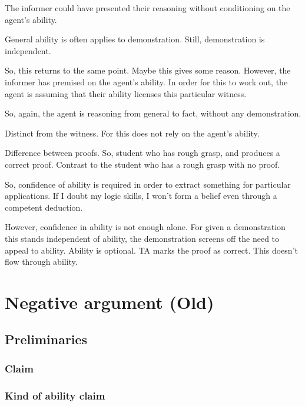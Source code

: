 \documentclass[10pt]{article}
\begin{document}
The informer could have presented their reasoning without conditioning on the agent's ability.

General ability is often applies to demonstration.
Still, demonstration is independent.

So, this returns to the same point.
Maybe this gives some reason.
However, the informer has premised on the agent's ability.
In order for this to work out, the agent is assuming that their ability licenses this particular witness.

So, again, the agent is reasoning from general to fact, without any demonstration.


Distinct from the witness.
For this does not rely on the agent's ability.

Difference between proofs.
So, student who has rough grasp, and produces a correct proof.
Contrast to the student who has a rough grasp with no proof.

So, confidence of ability is required in order to extract something for particular applications.
If I doubt my logic skills, I won't form a belief even through a competent deduction.

However, confidence in ability is not enough alone.
For given a demonstration this stands independent of ability, the demonstration screens off the need to appeal to ability.
Ability is optional.
TA marks the proof as correct.
This doesn't flow through ability.




\newpage

\section{Negative argument (Old)}
\label{sec:negative-argument}



\subsection{Preliminaries}
\label{sec:preliminaries}

\subsubsection{Claim}
\label{sec:claim}

\subsubsection{Kind of ability claim}
\label{sec:kind-ability-claim}
\end{document}
